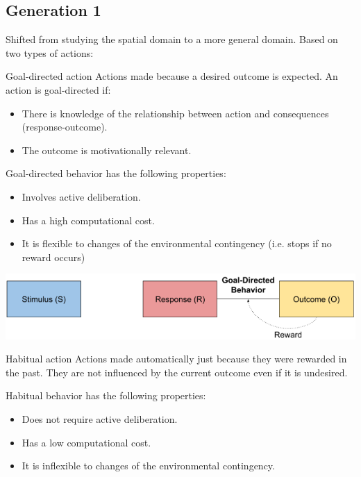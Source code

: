 \subsection{Generation 1} 

Shifted from studying the spatial domain to a more general domain.
Based on two types of actions:
\begin{descriptionlist}
    \item[Goal-directed action] 
        Actions made because a desired outcome is expected.
        An action is goal-directed if:
        \begin{itemize}
            \item There is knowledge of the relationship between action and consequences (response-outcome).
            \item The outcome is motivationally relevant.
        \end{itemize}

        Goal-directed behavior has the following properties:
        \begin{itemize}
            \item Involves active deliberation.
            \item Has a high computational cost.
            \item It is flexible to changes of the environmental contingency (i.e. stops if no reward occurs)
        \end{itemize}

        \begin{center}
            \includegraphics[width=0.65\linewidth]{./img/goal_directed_behavior.png}
        \end{center}

    \item[Habitual action] 
        Actions made automatically just because they were rewarded in the past.
        They are not influenced by the current outcome even if it is undesired.

        Habitual behavior has the following properties:
        \begin{itemize}
            \item Does not require active deliberation.
            \item Has a low computational cost.
            \item It is inflexible to changes of the environmental contingency.
        \end{itemize}


\end{descriptionlist}
